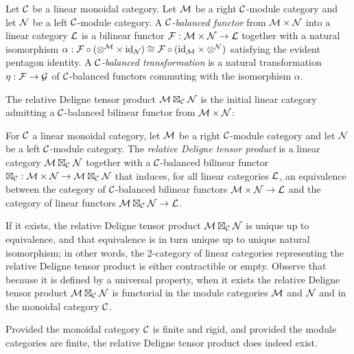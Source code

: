 \documentclass{amsart}
\begin{document}
\begin{definition}
	Let $\mathcal C$ be a linear monoidal category.  Let $\mathcal M$ be a right $\mathcal C$-module category and let $\mathcal N$ be a left $\mathcal C$-module category. A {\em $\mathcal C$-balanced functor} from $\mathcal M \times \mathcal N$ into a linear category $\mathcal L$ is a bilinear functor $\mathcal F: \mathcal M \times \mathcal N \to \mathcal L$ together with a natural isomorphism $\alpha: \mathcal F \circ (\otimes^{\mathcal M} \times \mathrm{id}_{\mathcal N}) \cong \mathcal F \circ (\mathrm{id}_{\mathcal M} \times \otimes^{\mathcal N})$ satisfying the evident pentagon identity. A {\em $\mathcal C$-balanced transformation} is a natural transformation $\eta:\mathcal F \to \mathcal G$ of $\mathcal C$-balanced functors commuting with the isomorphism $\alpha$.
\end{definition}

The relative Deligne tensor product $\mathcal M \boxtimes_\mathcal C \mathcal N$ is the initial linear category admitting a $\mathcal C$-balanced bilinear functor from $\mathcal M \times \mathcal N$:

\begin{definition}
	For $\mathcal C$ a linear monoidal category, let $\mathcal M$ be a right $\mathcal C$-module category and let $\mathcal N$ be a left $\mathcal C$-module category.  The {\em relative Deligne tensor product} is a linear category $\mathcal M \boxtimes_{\mathcal C} \mathcal N$ together with a $\mathcal C$-balanced bilinear functor $\boxtimes_{\mathcal C}: \mathcal M \times \mathcal N \to \mathcal M \boxtimes_{\mathcal C} \mathcal N$ that induces, for all linear categories $\mathcal L$, an equivalence between the category of $\mathcal C$-balanced bilinear functors $\mathcal M \times \mathcal N \to \mathcal L$ and the category of linear functors $\mathcal M \boxtimes_{\mathcal C} \mathcal N \to \mathcal L$. 
\end{definition}

\nid If it exists, the relative Deligne tensor product $\mathcal M \boxtimes_\mathcal C \mathcal N$ is unique up to equivalence, and that equivalence is in turn unique up to unique natural isomorphism; in other words, the 2-category of linear categories representing the relative Deligne tensor product is either contractible or empty.  Observe that because it is defined by a universal property, when it exists the relative Deligne tensor product $\mathcal M \boxtimes_\mathcal C \mathcal N$ is functorial in the module categories $\mathcal M$ and $\mathcal N$ and in the monoidal category $\mathcal C$. %

Provided the monoidal category $\mathcal C$ is finite and rigid, and provided the module categories are finite, the relative Deligne tensor product does indeed exist.
\end{document}
